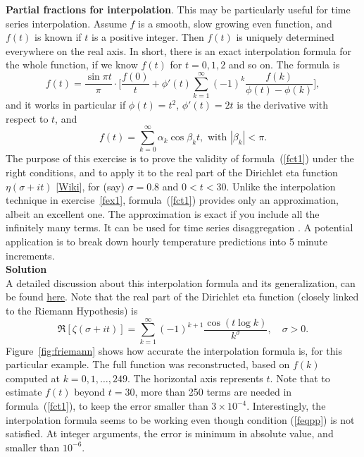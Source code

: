 \documentclass[oneside,10pt]{book}
\begin{document}
\begin{Exercise}{\bf Partial fractions for interpolation}. This may be particularly useful for time series interpolation. Assume $f$ is a smooth, slow growing even function, and $f(t)$ is known if $t$ is a positive integer. Then $f(t)$ is uniquely determined everywhere on the real axis. In short, there is an exact interpolation formula for the whole function, if we know $f(t)$ for $t=0,1,2$ and so on. The formula is
\begin{equation}
f(t) = \frac{\sin\pi t}{\pi}\cdot \Big[\frac{f(0)}{t} +\phi'(t)\sum_{k=1}^\infty (-1)^k \frac{f(k)}{\phi(t)-\phi(k)}
\Big],\label{fct1}
\end{equation}
and it works in particular if $\phi(t)=t^2$, $\phi'(t)=2t$ is the derivative with respect to $t$, and
\begin{equation}
f(t)=\sum_{k=0}^\infty \alpha_k \cos \beta_k t, \mbox{ with } |\beta_k|<\pi. \label{feqpp}
\end{equation}
The purpose of this exercise is to prove the validity of formula~(\ref{fct1}) under the right conditions, and to apply it to the real part of the Dirichlet eta function $\eta(\sigma+it)$
 [\href{https://en.wikipedia.org/wiki/Dirichlet_eta_function}{Wiki}], for (say)
$\sigma=0.8$ and $0<t<30$. Unlike the interpolation technique in exercise~\ref{fex1}, formula~(\ref{fct1}) provides only an approximation, albeit an excellent one. The approximation is exact
 if you include all the infinitely many terms. It can be used for \textcolor{index}{time series disaggregation} \cite{vgsmith}.
A potential application is to break down hourly temperature predictions into 5 minute increments.\vspace{1ex} \\
{\bf Solution} \vspace{1ex} \\
A detailed discussion about this interpolation formula and its generalization, can be found \href{https://mathoverflow.net/questions/376081/infinite-partial-fraction-expansions-to-compute-fractional-iterations-and-recurr}{here}. Note that the real part of the Dirichlet eta function (closely linked to the \textcolor{index}{Riemann Hypothesis}) is
$$
\Re[\zeta(\sigma+it)]=\sum_{k=1}^\infty (-1)^{k+1}\frac{\cos(t\log k)}{k^\sigma}, \quad \sigma>0.
$$
Figure~\ref{fig:friemann} shows how accurate the interpolation formula is, for this particular example. The full function was reconstructed, based on $f(k)$ computed at $k=0,1,\dots,249$. The horizontal axis represents $t$. Note that to estimate $f(t)$ beyond $t=30$, more than 250 terms are needed in formula~(\ref{fct1}),
to keep the error smaller than $3\times 10^{-4}$. Interestingly, the interpolation formula seems to be working even though condition (\ref{feqpp}) is not satisfied. At integer arguments, the error is minimum in absolute value, and smaller than $10^{-6}$.


\end{Exercise}
\end{document}

